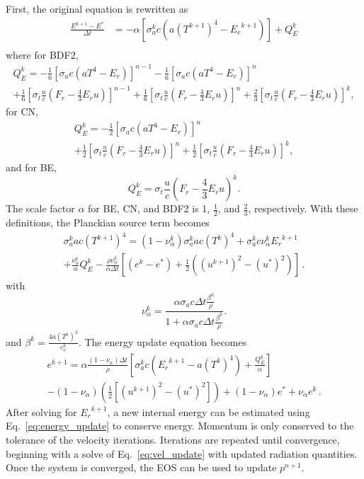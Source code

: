\documentclass[preprint,12pt]{elsarticle}
\newcommand{\pep}{\, .}
\newcommand{\half}{\frac{1}{2}}
\newcommand{\twothird}{\frac{2}{3}}
\newcommand{\sixth}{\frac{1}{6}}
\newcommand{\E}{{E_r}}
\newcommand{\F}{{F_r}}
\newcommand{\dt}{\Delta t}
\newcommand{\sa}{\sigma_a}
\newcommand{\CN}[3]{\half\left[#1\right]^#2 + \half\left[#1\right]^#3}
\newcommand{\BDF}[4]{\sixth\left[#1\right]^{#2} + \sixth\left[#1\right]^{#3} + \twothird\left[#1\right]^{#4}}
\begin{document}
First, the original equation is rewritten as
\begin{align*}
   \frac{E^{k+1} - E^*}{\dt} &= - \alpha \left[\sa^k c \left(
   a(T^{k+1})^4 - \E^{k+1}\right)\right]+Q_E^k \\
\end{align*}
where for BDF2,
\begin{multline}
    Q^{k}_E = -\frac{1}{6}\left[\sa c\left( aT^4 - \E\right)\right]^{n-1}
    -\frac{1}{6}\left[\sa c\left( aT^4 - \E\right)\right]^{n} \\
    +\BDF{\sigma_t \frac{u}{c} \left( \F - \frac{4}{3} \E u \right)}{n-1}{n}{k},
\end{multline}
for CN,
\begin{multline}
    Q^{k}_E = -\half\left[\sa c\left( aT^4 - \E\right)\right]^n\\
   +\CN{\sigma_t \frac{u}{c} \left( \F - \frac{4}{3} \E u \right)}{n}{k},
\end{multline}
and for BE,
\begin{equation*}
    Q^{k}_E = \sigma_t \frac{u}{c} \left( \F - \frac{4}{3} \E u \right)^k.
\end{equation*}
The scale factor $\alpha$ for BE, CN, and BDF2 is 1, $\half$, and $\frac{2}{3}$,
respectively.  With these definitions, the Planckian source term becomes
\begin{multline}
   \sigma_a^k a c\left(T^{k+1}\right)^4 = \left(1 - \nu_{\alpha}^k\right)
   \sigma_a^k a c (T^k)^4 + \sigma_a^k c \nu_{\alpha}^k \E^{k+1}\\
   +\frac{\nu_{\alpha}^k}{\alpha} Q_E^k - \frac{\rho\nu_{\alpha}^k}{\alpha\dt}
   \left[(e^k - e^*) + \frac{1}{2}((u^{k+1})^2 - (u^*)^2)\right] \pep
\end{multline}
with 
\begin{equation}
    \nu^k_{\alpha} = \frac{\alpha\sigma_a c\Delta t \frac{\beta^k}{\rho}}{1 +
    \alpha\sigma_a c\Delta t \frac{\beta^k}{\rho}}.
\end{equation}
and $\beta^k=\frac{4a(T^k)^3}{c_v^k}$.
The energy update equation becomes
\begin{multline}
    \label{eq:energy_update}
    e^{k+1} = \alpha\frac{(1-\nu_{\alpha})\Delta t}{\rho}\left[\sigma_a^k c \left(
    \E^{k+1} - a(T^k)^4\right) + \frac{Q_E^k}{\alpha} \right] \\ - (1 -
    \nu_{\alpha})\left(\frac{1}{2}[(u^{k+1})^2 - (u^*)^2]\right)
    +(1-\nu_\alpha)e^*+ \nu_{\alpha}e^k \pep
\end{multline}
After solving for $\E^{k+1}$, a new internal energy can be estimated
using Eq.~\eqref{eq:energy_update} to conserve energy.  Momentum is only conserved to
the tolerance of the velocity iterations.  
Iterations are repeated until
convergence, beginning with a solve of Eq.~\eqref{eq:vel_update} with updated
radiation quantities.  Once the system is converged, the EOS can be used to
update $p^{n+1}$.
\end{document}
